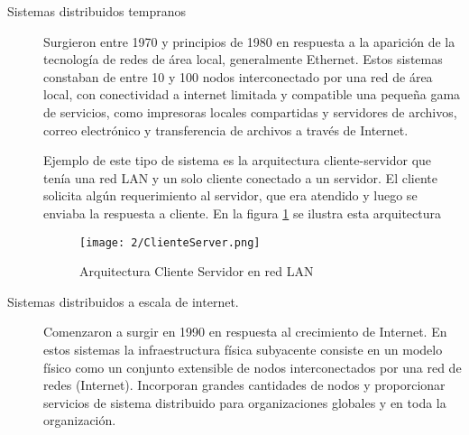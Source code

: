 \begin{description}
	\item[Sistemas distribuidos tempranos] Surgieron entre 1970 y principios de 1980 en respuesta a la aparici\'on  de la tecnología de redes de área local, generalmente Ethernet. Estos sistemas constaban de entre 10 y 100 nodos interconectado por una red de área local, con conectividad a internet limitada y compatible una pequeña gama de servicios, como impresoras locales compartidas y servidores de archivos,  correo electrónico  y transferencia de archivos a través de Internet.  
	
	
	Ejemplo de este tipo de sistema es la arquitectura \gls{cliente-servidor}  que ten\'ia  una red LAN  y un solo cliente conectado a un 	servidor. El cliente solicita  algún requerimiento al servidor, que era atendido y  luego se enviaba la respuesta a cliente. En la figura \ref{fig:ClienteServer} se ilustra  esta arquitectura
	
	\begin{figure}%
		\texttt{[image: 2/ClienteServer.png]}
		\caption{Arquitectura Cliente Servidor en red LAN}
		\label{fig:ClienteServer}
	\end{figure}
	
	\item[Sistemas distribuidos a escala de internet.]  Comenzaron a surgir en  1990 en respuesta al crecimiento de Internet. En estos sistemas la infraestructura física subyacente consiste en un modelo físico como un conjunto extensible de nodos interconectados por una red de redes (Internet).  Incorporan grandes cantidades de nodos y proporcionar servicios de sistema distribuido para organizaciones globales y en toda la organización.   
	
	
	

\end{description}
